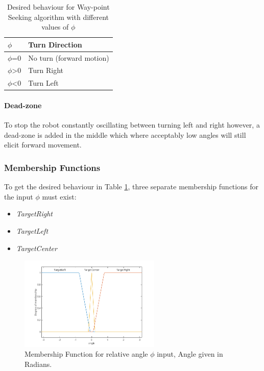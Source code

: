 \documentclass[11pt]{article}
\numberwithin{equation}{section}
\begin{document}
\begin{table}[H]
\caption{\label{tabWaypointSeekingDesiredBehaviour}Desired behaviour for Way-point Seeking algorithm with different values of \(\phi\)}
\centering
\begin{tabular}{ll}
\toprule
\(\phi\) & Turn Direction\\
\midrule
\(\phi\)=0 & No turn (forward motion)\\
\(\phi\)>0 & Turn Right\\
\(\phi\)<0 & Turn Left\\
\bottomrule
\end{tabular}
\end{table}

\paragraph{Dead-zone}
\label{sec:orgf71aee1}
To stop the robot constantly oscillating between turning left and right however, a dead-zone is added in the middle which where acceptably low angles will still elicit forward movement.

\subsubsection{Membership Functions}
\label{sec:org318fe7f}
To get the desired behaviour in Table \ref{tabWaypointSeekingDesiredBehaviour}, three separate membership functions for the input \(\phi\) must exist:
\begin{itemize}
\item \emph{TargetRight}
\item \emph{TargetLeft}
\item \emph{TargetCenter}
\end{itemize}

\begin{figure}[H]
\centering
\includegraphics[width=0.6\textwidth]{Section3/Figures/FinalFigures/AngleMembershipFunction.png}
\caption{\label{figMembershipFunctionAngle}Membership Function for relative angle \(\phi\) input, Angle given in Radians.}
\end{figure}
\end{document}
